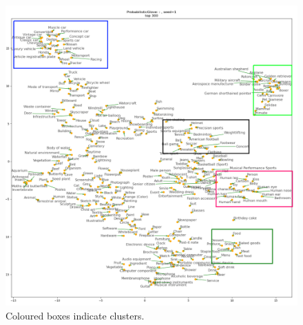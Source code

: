 \begin{figure}[H]
    \centering
    \includegraphics[width=\textwidth]{images/method/probabilistic_independent/top300_tsne_openimages__ProbabilisticGlove_1_clusters.png}
    \caption{
        Coloured boxes indicate clusters.
    }
\end{figure}

